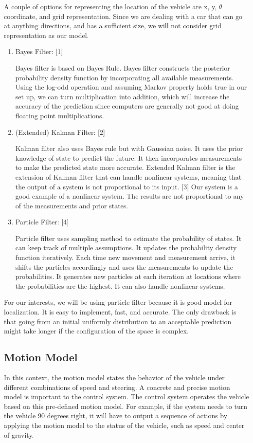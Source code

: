 \documentclass[compsoc,draftclsnofoot,onecolumn,10pt]{IEEEtran}
\begin{document}
A couple of options for representing the location of the vehicle are x, y, $\theta$ coordinate,
and grid representation. Since we are dealing with a car that can go at anything directions, 
and has a sufficient size, we will not consider grid representation as our model.  
\begin{enumerate}
	\item Bayes Filter: [1]\par
	Bayes filter is based on Bayes Rule. Bayes filter constructs the posterior probability 
	density function by incorporating all available measurements. Using the log-odd operation 
	and assuming Markov property holds true in our set up, we can turn multiplication into 
	addition, which will increase the accuracy of the prediction since computers are generally 
	not good at doing floating point multiplications. 
	\item (Extended) Kalman Filter: [2]\par
	Kalman filter also uses Bayes rule but with Gaussian noise. It uses the prior knowledge 
	of state to predict the future. It then incorporates measurements to make the predicted 
	state more accurate. Extended Kalman filter is the extension of Kalman filter that can 
	handle nonlinear systems, meaning that the output of a system is not proportional to its 
	input. [3] Our system is a good example of a nonlinear system. The results are not proportional 
	to any of the measurements and prior states.  
	\item Particle Filter: [4]\par
	Particle filter uses sampling method to estimate the probability of states. It can keep 
	track of multiple assumptions. It updates the probability density function iteratively. 
	Each time new movement and measurement arrive, it shifts the particles accordingly and 
	uses the measurements to update the probabilities. It generates new particles at each 
	iteration at locations where the probabilities are the highest. It can also handle 
	nonlinear systems. 
\end{enumerate}
For our interests, we will be using particle filter because it is good model for 
localization. It is easy to implement, fast, and accurate. The only drawback is that 
going from an initial uniformly distribution to an acceptable prediction might take 
longer if the configuration of the space is complex.

\subsection{Motion Model}
In this context, the motion model states the behavior of the vehicle under different 
combinations of speed and steering. A concrete and precise motion model is important to 
the control system. The control system operates the vehicle based on this pre-defined 
motion model. For example, if the system needs to turn the vehicle 90 degrees right, it 
will have to output a sequence of actions by applying the motion model to the status of 
the vehicle, such as speed and center of gravity.\par
\end{document}
